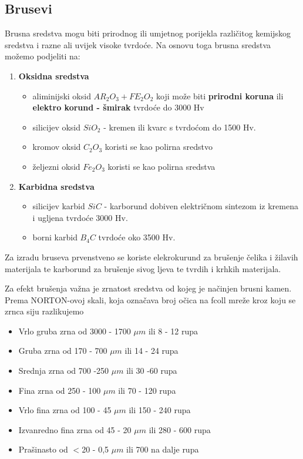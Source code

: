 \documentclass[a4paper,12pt]{article}
\numberwithin{figure}{section}
\begin{document}
\subsection{Brusevi}
Brusna sredstva mogu biti prirodnog ili umjetnog porijekla različitog kemijskog sredstva i razne ali uvijek visoke tvrdoće. Na osnovu toga brusna sredstva možemo podjeliti na:
\begin{enumerate}
\item \textbf{Oksidna sredstva}
\begin{itemize}
\item aliminijski oksid $AR_{2}O_{3} + FE_{2}O_{2}$ koji može biti \textbf{prirodni koruna} ili \textbf{elektro korund - šmirak} tvrdoće do 3000 Hv
\item silicijev oksid $SiO_{2}$ - kremen ili kvarc s tvrdoćom do 1500 Hv.
\item kromov oksid $C_{2}O_{3}$ koristi se kao polirna sredstvo
\item željezni oksid $Fe_{2}O_{3}$ koristi se kao polirna sredstva
\end{itemize}
\item \textbf{Karbidna sredstva}
\begin{itemize}
\item silicijev karbid $SiC$ - karborund dobiven električnom sintezom iz kremena i ugljena tvrdoće 3000 Hv.
\item borni karbid $B_{4}C$ tvrdoće oko 3500 Hv.
\end{itemize}
\end{enumerate}
Za izradu bruseva prvenstveno se koriste elekrokurund za brušenje čelika i žilavih materijala te karborund za brušenje sivog ljeva te tvrdih i krhkih materijala. \par
Za efekt brušenja važna je zrnatost sredstva od kojeg je načinjen brusni kamen. Prema NORTON-ovoj skali, koja označava broj očica na fcoll mreže kroz koju se zrnca siju razlikujemo
\begin{itemize}
\item Vrlo gruba zrna od 3000 - 1700 $\mu m$ ili 8 - 12 rupa
\item Gruba zrna od 170 - 700 $\mu m$ ili 14 - 24 rupa
\item Srednja zrna od 700 -250 $\mu m$ ili 30 -60 rupa
\item Fina zrna od 250 - 100 $\mu m$ ili 70 - 120 rupa
\item Vrlo fina zrna od 100 - 45 $\mu m$ ili 150 - 240 rupa
\item Izvanredno fina zrna od 45 - 20 $\mu m$ ili 280 - 600 rupa
\item Prašinasto od $<$20 - 0,5 $\mu m$ ili 700 na dalje rupa
\end{itemize}
\end{document}
